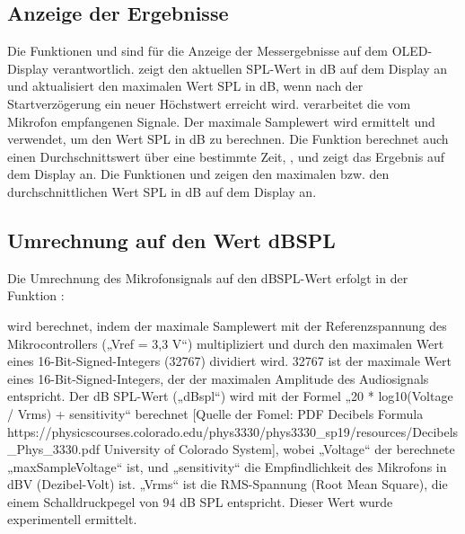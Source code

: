 \subsection{Anzeige der Ergebnisse}
Die Funktionen  und  sind für die Anzeige der Messergebnisse auf dem OLED-Display verantwortlich.  zeigt den aktuellen SPL-Wert in dB auf dem Display an und aktualisiert den maximalen Wert SPL in dB, wenn nach der Startverzögerung ein neuer Höchstwert erreicht wird.  verarbeitet die vom Mikrofon empfangenen Signale. Der maximale Samplewert wird ermittelt und verwendet, um den Wert SPL in dB zu berechnen. Die Funktion berechnet auch einen Durchschnittswert über eine bestimmte Zeit, , und zeigt das Ergebnis auf dem Display an. Die Funktionen  und  zeigen den maximalen bzw. den durchschnittlichen Wert SPL in dB auf dem Display an.

\subsection{Umrechnung auf den Wert dBSPL}

Die Umrechnung des Mikrofonsignals auf den dBSPL-Wert erfolgt in der Funktion :

{
     \label{Code:Mirco:StartSampling}
}


 wird berechnet, indem der maximale Samplewert  mit der Referenzspannung des Mikrocontrollers („Vref = 3,3 V“) multipliziert und durch den maximalen Wert eines 16-Bit-Signed-Integers (32767) dividiert wird. 32767 ist der maximale Wert eines 16-Bit-Signed-Integers, der der maximalen Amplitude des Audiosignals entspricht.
Der dB SPL-Wert („dBspl“) wird mit der Formel „20 * log10(Voltage / Vrms) + sensitivity“ berechnet [Quelle der Fomel: PDF Decibels Formula https://physicscourses.colorado.edu/phys3330/phys3330\_sp19/resources/Decibels\_Phys\_3330.pdf University of Colorado System], wobei „Voltage“ der berechnete „maxSampleVoltage“ ist, und „sensitivity“ die Empfindlichkeit des Mikrofons in dBV (Dezibel-Volt) ist. „Vrms“ ist die RMS-Spannung (Root Mean Square), die einem Schalldruckpegel von 94 dB SPL entspricht. Dieser Wert wurde experimentell ermittelt.



